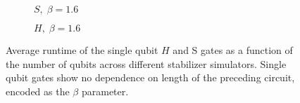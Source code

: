 \begin{figure}[p]
\centering
\begin{subfigure}[t]{0.48\textwidth}
    \centering
    \caption{$S,\;\beta=1.6$}
    \begin{scaletikzpicturetowidth}{\textwidth}
        
    \end{scaletikzpicturetowidth}
\end{subfigure}
\begin{subfigure}[t]{0.48\textwidth}
    \centering
    \caption{$H,\;\beta=1.6$}
    \begin{scaletikzpicturetowidth}{\textwidth}
        
    \end{scaletikzpicturetowidth}
\end{subfigure}
\caption{Average runtime of the single qubit $H$ and S gates as a function of the number of qubits across different stabilizer simulators. Single qubit gates show no dependence on length of the preceding circuit, encoded as the $\beta$ parameter.}
\label{fig:single_qubit_clifford_timings}
\end{figure}
